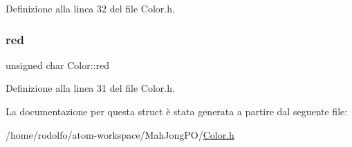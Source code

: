 Definizione alla linea 32 del file Color.\+h.

\mbox{\label{struct_color_a245f5a423cdaaaeff27047036c24b7ef}} 
\subsubsection{\texorpdfstring{red}{red}}
{\footnotesize\ttfamily unsigned char Color\+::red}



Definizione alla linea 31 del file Color.\+h.



La documentazione per questa struct è stata generata a partire dal seguente file\+:\begin{DoxyCompactItemize}
\item 
/home/rodolfo/atom-\/workspace/\+Mah\+Jong\+P\+O/\hyperlink{_color_8h}{Color.\+h}\end{DoxyCompactItemize}
